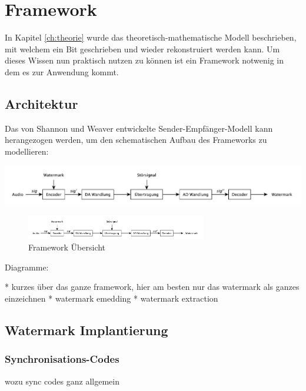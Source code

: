 \chapter{Framework}
\label{ch:methode}

In Kapitel \ref{ch:theorie} wurde das theoretisch-mathematische Modell beschrieben, mit welchem ein Bit geschrieben und wieder rekonstruiert werden kann. Um dieses Wissen nun praktisch nutzen zu können ist ein Framework notwenig in dem es zur Anwendung kommt. 

\section{Architektur}

Das von Shannon und Weaver entwickelte Sender-Empfänger-Modell \cite{shannon2001mathematical} kann herangezogen werden, um den schematischen Aufbau des Frameworks zu modellieren:

\includegraphics{figures/diagram-framework}


\begin{figure}[tb]
	\centering
	\includegraphics[width=0.7\textwidth]{figures/diagram-framework}
	\caption{Framework Übersicht}
	\label{fig:diagram-framework}
\end{figure}




Diagramme:

* kurzes über das ganze framework, hier am besten nur das watermark als ganzes einzeichnen
* watermark emedding
* watermark extraction

\section{Watermark Implantierung}
\label{sec:embedding}

\subsection{Synchronisations-Codes}

wozu sync codes ganz allgemein

